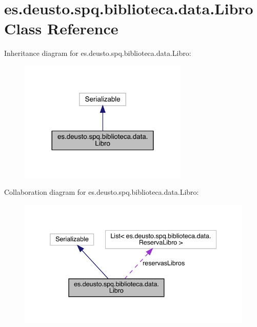 \hypertarget{classes_1_1deusto_1_1spq_1_1biblioteca_1_1data_1_1_libro}{}\section{es.\+deusto.\+spq.\+biblioteca.\+data.\+Libro Class Reference}
\label{classes_1_1deusto_1_1spq_1_1biblioteca_1_1data_1_1_libro}


Inheritance diagram for es.\+deusto.\+spq.\+biblioteca.\+data.\+Libro\+:
\nopagebreak
\begin{figure}[H]
\begin{center}
\leavevmode
\includegraphics[width=228pt]{classes_1_1deusto_1_1spq_1_1biblioteca_1_1data_1_1_libro__inherit__graph}
\end{center}
\end{figure}


Collaboration diagram for es.\+deusto.\+spq.\+biblioteca.\+data.\+Libro\+:
\nopagebreak
\begin{figure}[H]
\begin{center}
\leavevmode
\includegraphics[width=338pt]{classes_1_1deusto_1_1spq_1_1biblioteca_1_1data_1_1_libro__coll__graph}
\end{center}
\end{figure}
